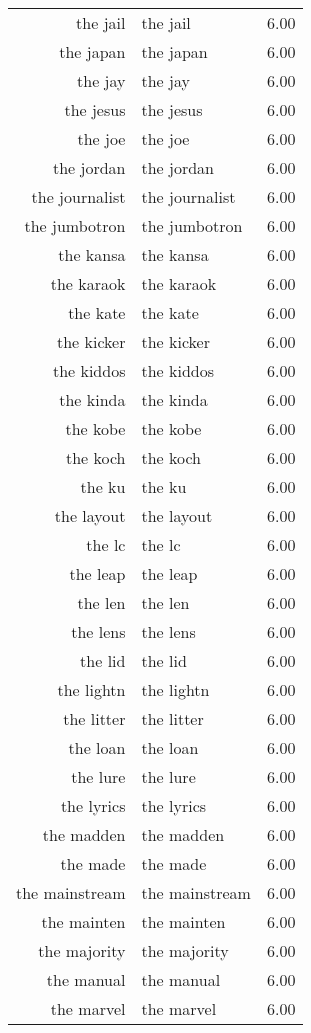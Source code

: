\begin{table}[ht]
\begin{tabular}{rlr}
  the jail & the jail & 6.00 \\ 
  the japan & the japan & 6.00 \\ 
  the jay & the jay & 6.00 \\ 
  the jesus & the jesus & 6.00 \\ 
  the joe & the joe & 6.00 \\ 
  the jordan & the jordan & 6.00 \\ 
  the journalist & the journalist & 6.00 \\ 
  the jumbotron & the jumbotron & 6.00 \\ 
  the kansa & the kansa & 6.00 \\ 
  the karaok & the karaok & 6.00 \\ 
  the kate & the kate & 6.00 \\ 
  the kicker & the kicker & 6.00 \\ 
  the kiddos & the kiddos & 6.00 \\ 
  the kinda & the kinda & 6.00 \\ 
  the kobe & the kobe & 6.00 \\ 
  the koch & the koch & 6.00 \\ 
  the ku & the ku & 6.00 \\ 
  the layout & the layout & 6.00 \\ 
  the lc & the lc & 6.00 \\ 
  the leap & the leap & 6.00 \\ 
  the len & the len & 6.00 \\ 
  the lens & the lens & 6.00 \\ 
  the lid & the lid & 6.00 \\ 
  the lightn & the lightn & 6.00 \\ 
  the litter & the litter & 6.00 \\ 
  the loan & the loan & 6.00 \\ 
  the lure & the lure & 6.00 \\ 
  the lyrics & the lyrics & 6.00 \\ 
  the madden & the madden & 6.00 \\ 
  the made & the made & 6.00 \\ 
  the mainstream & the mainstream & 6.00 \\ 
  the mainten & the mainten & 6.00 \\ 
  the majority & the majority & 6.00 \\ 
  the manual & the manual & 6.00 \\ 
  the marvel & the marvel & 6.00 \\ 

\end{tabular}
\end{table}
